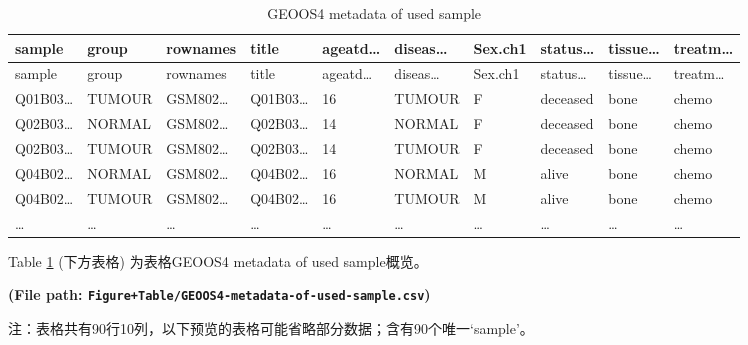 \documentclass[
]{article}
\begin{document}
\begin{center}\vspace{1.5cm}\end{center}

\begin{center}\vspace{1.5cm}\end{center}

\begin{longtable}[]{@{}llllllllll@{}}
\caption{\label{tab:GEOOS4-metadata-of-used-sample}GEOOS4 metadata of used sample}\tabularnewline
\toprule
sample & group & rownames & title & ageatd\ldots{} & diseas\ldots{} & Sex.ch1 & status\ldots{} & tissue\ldots{} & treatm\ldots{}\tabularnewline
\midrule
\endfirsthead
\toprule
sample & group & rownames & title & ageatd\ldots{} & diseas\ldots{} & Sex.ch1 & status\ldots{} & tissue\ldots{} & treatm\ldots{}\tabularnewline
\midrule
\endhead
Q01B03\ldots{} & TUMOUR & GSM802\ldots{} & Q01B03\ldots{} & 16 & TUMOUR & F & deceased & bone & chemo\tabularnewline
Q02B03\ldots{} & NORMAL & GSM802\ldots{} & Q02B03\ldots{} & 14 & NORMAL & F & deceased & bone & chemo\tabularnewline
Q02B03\ldots{} & TUMOUR & GSM802\ldots{} & Q02B03\ldots{} & 14 & TUMOUR & F & deceased & bone & chemo\tabularnewline
Q04B02\ldots{} & NORMAL & GSM802\ldots{} & Q04B02\ldots{} & 16 & NORMAL & M & alive & bone & chemo\tabularnewline
Q04B02\ldots{} & TUMOUR & GSM802\ldots{} & Q04B02\ldots{} & 16 & TUMOUR & M & alive & bone & chemo\tabularnewline
\ldots{} & \ldots{} & \ldots{} & \ldots{} & \ldots{} & \ldots{} & \ldots{} & \ldots{} & \ldots{} & \ldots{}\tabularnewline
\bottomrule
\end{longtable}

Table \ref{tab:GEOOS4-metadata-of-used-sample} (下方表格) 为表格GEOOS4 metadata of used sample概览。

\textbf{(File path: \texttt{Figure+Table/GEOOS4-metadata-of-used-sample.csv})}

\begin{center}\begin{tcolorbox}[colback=gray!10, colframe=gray!50, width=0.9\linewidth, arc=1mm, boxrule=0.5pt]注：表格共有90行10列，以下预览的表格可能省略部分数据；含有90个唯一`sample'。
\end{tcolorbox}
\end{center}

\begin{center}\vspace{1.5cm}\end{center}
\end{document}
